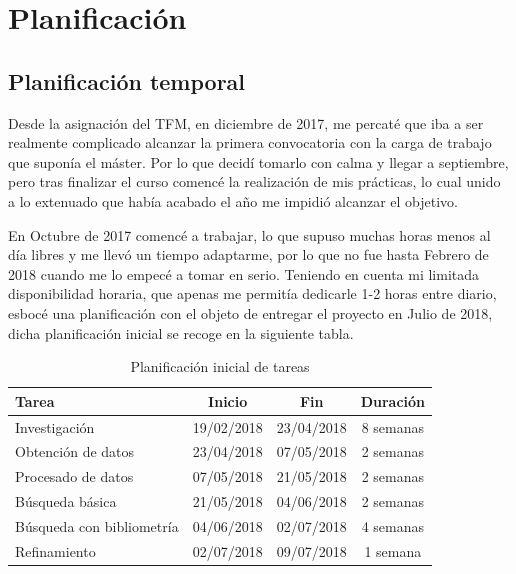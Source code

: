 \chapter{Planificación}

\section{Planificación temporal}

Desde la asignación del \acrshort{TFM}, en diciembre de 2017, me percaté que iba a ser realmente complicado alcanzar la primera convocatoria con la carga de trabajo que suponía el máster. Por lo que decidí tomarlo con calma y llegar a septiembre, pero tras finalizar el curso comencé la realización de mis prácticas, lo cual unido a lo extenuado que había acabado el año me impidió alcanzar el objetivo. 

En Octubre de 2017 comencé a trabajar, lo que supuso muchas horas menos al día libres y me llevó un tiempo adaptarme, por lo que no fue hasta Febrero de 2018 cuando me lo empecé a tomar en serio. Teniendo en cuenta mi limitada disponibilidad horaria, que apenas me permitía dedicarle 1-2 horas entre diario, esbocé una planificación con el objeto de entregar el proyecto en Julio de 2018, dicha planificación inicial se recoge en la siguiente tabla.

\begin{table} [h!]
	\centering
	\begin{tabular}{l c c c}
		\hline
		\textbf{Tarea}            & \textbf{Inicio} & \textbf{Fin} & \textbf{Duración} \\ \hline\hline
		Investigación             & 19/02/2018      & 23/04/2018   & 8 semanas         \\ \hline
		Obtención de datos        & 23/04/2018      & 07/05/2018   & 2 semanas         \\ \hline
		Procesado de datos        & 07/05/2018      & 21/05/2018   & 2 semanas         \\ \hline
		Búsqueda básica           & 21/05/2018      & 04/06/2018   & 2 semanas         \\ \hline
		Búsqueda con bibliometría & 04/06/2018      & 02/07/2018   & 4 semanas         \\ \hline
		Refinamiento              & 02/07/2018      & 09/07/2018   & 1 semana          \\ \hline
	\end{tabular}
	\caption{Planificación inicial de tareas}
\end{table}

